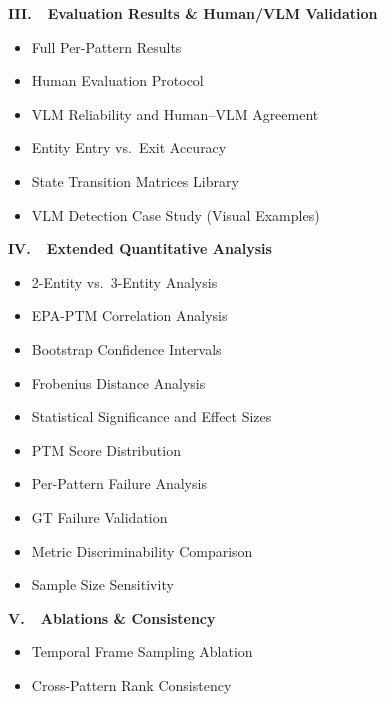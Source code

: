 \documentclass[sigconf,review,anonymous]{acmart}
\begin{document}
\vspace{0.3em}
\noindent\textbf{III.\ \ Evaluation Results \& Human/VLM Validation}
\begin{itemize}[nosep,leftmargin=1.5em]
\item[\S\ref{app:per_pattern}] Full Per-Pattern Results
\item[\S\ref{app:human_eval}] Human Evaluation Protocol
\item[\S\ref{app:vlm_quality}] VLM Reliability and Human--VLM Agreement
\item[\S\ref{app:entry_exit}] Entity Entry vs.\ Exit Accuracy
\item[\S\ref{app:delta_s}] State Transition Matrices Library
\item[\S\ref{app:vlm_cases}] VLM Detection Case Study (Visual Examples)
\end{itemize}

\vspace{0.3em}
\noindent\textbf{IV.\ \ Extended Quantitative Analysis}
\begin{itemize}[nosep,leftmargin=1.5em]
\item[\S\ref{app:entity_count}] 2-Entity vs.\ 3-Entity Analysis
\item[\S\ref{app:correlation}] EPA-PTM Correlation Analysis
\item[\S\ref{app:bootstrap}] Bootstrap Confidence Intervals
\item[\S\ref{app:frobenius}] Frobenius Distance Analysis
\item[\S\ref{app:significance}] Statistical Significance and Effect Sizes
\item[\S\ref{app:distributions}] PTM Score Distribution
\item[\S\ref{app:failure_pattern}] Per-Pattern Failure Analysis
\item[\S\ref{app:gt_failures}] GT Failure Validation
\item[\S\ref{app:metric_discriminability}] Metric Discriminability Comparison
\item[\S\ref{app:sample_size}] Sample Size Sensitivity
\end{itemize}

\vspace{0.3em}
\noindent\textbf{V.\ \ Ablations \& Consistency}
\begin{itemize}[nosep,leftmargin=1.5em]
\item[\S\ref{app:temporal_ablation}] Temporal Frame Sampling Ablation
\item[\S\ref{app:rank_consistency}] Cross-Pattern Rank Consistency
\end{itemize}
\end{document}
